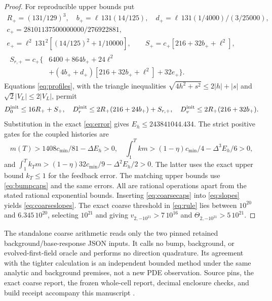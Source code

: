 \documentclass[11pt]{article}
\begin{document}
\begin{proof}
For reproducible upper bounds put
\begin{gather*}
 R_+=(131/129)^3,\quad b_+=\ell\,131(14/125),\quad
 d_+=\ell\,131(1/4000)/(3/25000),\\
 c_+=28101137500000000/276922881,\\
 e_+=\ell^2\,131^2[(14/125)^2+1/10000],\qquad
 S_+=c_+[216+32b_++\ell^2],\\
 \begin{aligned}
 S_{r,+}=c_+\{&6400+864b_++24\ell^2\\
                  &+(4b_++d_+)[216+32b_++\ell^2]+32e_+\}.
 \end{aligned}
\end{gather*}
Equations \eqref{eq:profiles}, with the triangle inequalities
$\sqrt{4h^2+s^2}\le2|h|+|s|$ and $\sqrt2|V_L|\le2|V_L|$,
permit
\begin{equation*}
 D_0^{\rm init}\le16R_++S_+,\quad
 D_r^{\rm init}\le2R_+(216+24b_+)+S_{r,+},\quad
 D_v^{\rm init}\le2R_+(216+32b_+).
\end{equation*}
Substitution in the exact \eqref{eq:error} gives
$E_h\le243841044.434$. The strict positive gates for the coupled
histories are
\begin{equation}
 m(T)>1408c_{\min}/81-\Delta E_h>0,\quad
 \int_1^Tkm>(1-\eta)c_{\min}/4-\Delta^3E_h/6>0,
 \label{eq:coarsegates}
\end{equation}
and $\int_1^Tk_Tm>(1-\eta)32c_{\min}/9-\Delta^2E_h/2>0$.
The latter uses the exact upper bound $k_T\le1$ for the feedback error.
The matching upper bounds use \eqref{eq:bumpcaps} and the same errors.
All are rational operations apart from the stated rational exponential
bounds. Inserting \eqref{eq:coarsecaps} into \eqref{eq:slopes} yields
\eqref{eq:coarseslopes}. The exact coarse threshold in \eqref{eq:rule}
lies between $10^{20}$ and $6.345\,10^{20}$, selecting $10^{21}$ and
giving $v_{2,-10^{21}}>7\,10^{16}$ and
$\Theta_{2,-10^{21}}>5\,10^{21}$.
\end{proof}

The standalone coarse arithmetic reads only the two pinned retained
background/base-response JSON inputs. It calls no bump, background, or
evolved-first-field oracle and performs no direction quadrature. Its
agreement with the tighter calculation is an independent bounded method
under the same analytic and background premises, not a new PDE observation.
Source pins, the exact coarse report, the frozen whole-cell report,
decimal enclosure checks, and build receipt accompany this manuscript
\cite{records}.
\end{document}
